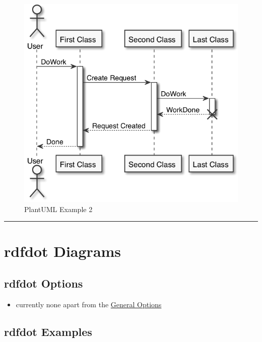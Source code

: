 \documentclass[]{article}
\begin{document}
\normalsize

\begin{figure}[htbp]
\centering
\includegraphics{tmp/ppp-render-_6_eB/image-10.png}
\caption{PlantUML Example 2\label{fig:plantuml-example-2}}
\end{figure}

\newpage

\begin{center}\rule{3in}{0.4pt}\end{center}

\newpage

\section{rdfdot Diagrams}\label{rdfdot-diagrams}

\subsection{rdfdot Options}\label{rdfdot-options}

\begin{itemize}
\itemsep1pt\parskip0pt
\item
  currently none apart from the \hyperref[general-options]{General
  Options}
\end{itemize}

\subsection{rdfdot Examples}\label{rdfdot-examples}
\end{document}
